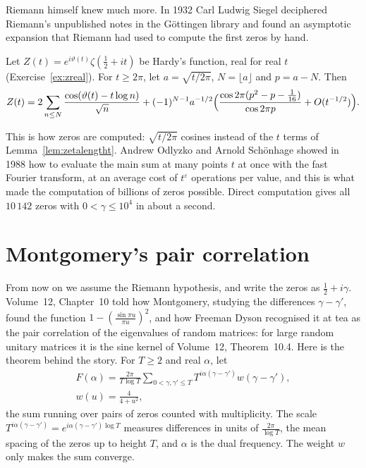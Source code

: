 Riemann himself knew much more. In 1932 Carl Ludwig Siegel deciphered Riemann's unpublished notes in the Göttingen library and found an asymptotic expansion that Riemann had used to compute the first zeros by hand.

\begin{theorem}\label{thm:riemannsiegel}
Let $Z(t)=e^{i\vartheta(t)}\zeta(\frac12+it)$ be Hardy's function, real for real $t$ (Exercise~\ref{ex:zreal}). For $t\ge2\pi$, let $a=\sqrt{t/2\pi}$, $N=\lfloor a\rfloor$ and $p=a-N$. Then
\[
Z(t)=2\sum_{n\le N}\frac{\cos(\vartheta(t)-t\log n)}{\sqrt n}+(-1)^{N-1}a^{-1/2}\Bigl(\frac{\cos2\pi(p^2-p-\frac1{16})}{\cos2\pi p}+O(t^{-1/2})\Bigr).
\]
\end{theorem}

This is how zeros are computed: $\sqrt{t/2\pi}$ cosines instead of the $t$ terms of Lemma~\ref{lem:zetalengtht}. Andrew Odlyzko and Arnold Schönhage showed in 1988 how to evaluate the main sum at many points $t$ at once with the fast Fourier transform, at an average cost of $t^{\varepsilon}$ operations per value, and this is what made the computation of billions of zeros possible. Direct computation gives all $10\,142$ zeros with $0<\gamma\le10^4$ in about a second.

\section{Montgomery's pair correlation}

From now on we assume the Riemann hypothesis, and write the zeros as $\frac12+i\gamma$. Volume~12, Chapter~10 told how Montgomery, studying the differences $\gamma-\gamma'$, found the function $1-(\frac{\sin\pi u}{\pi u})^2$, and how Freeman Dyson recognised it at tea as the pair correlation of the eigenvalues of random matrices: for large random unitary matrices it is the sine kernel of Volume~12, Theorem~10.4. Here is the theorem behind the story. For $T\ge2$ and real $\alpha$, let
\[
\begin{gathered}F(\alpha)=\frac{2\pi}{T\log T}\sum_{0<\gamma,\gamma'\le T}T^{i\alpha(\gamma-\gamma')}w(\gamma-\gamma'),\\w(u)=\frac4{4+u^2},\end{gathered}
\]
the sum running over pairs of zeros counted with multiplicity. The scale $T^{i\alpha(\gamma-\gamma')}=e^{i\alpha(\gamma-\gamma')\log T}$ measures differences in units of $\frac{2\pi}{\log T}$, the mean spacing of the zeros up to height $T$, and $\alpha$ is the dual frequency. The weight $w$ only makes the sum converge.

